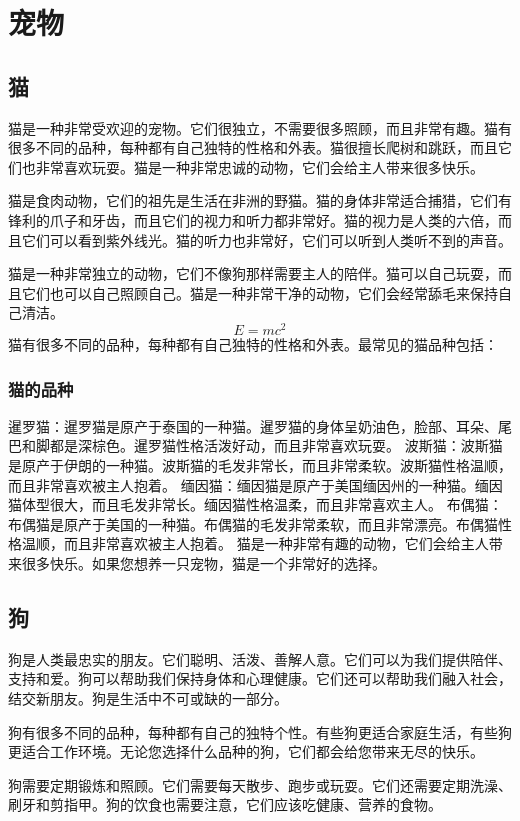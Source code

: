 \documentclass[engineeringmaster]{hquThesis}
\begin{document}
\chapter{宠物}
\section{猫}
猫是一种非常受欢迎的宠物。它们很独立，不需要很多照顾，而且非常有趣。猫有很多不同的品种，每种都有自己独特的性格和外表。猫很擅长爬树和跳跃，而且它们也非常喜欢玩耍。猫是一种非常忠诚的动物，它们会给主人带来很多快乐。

猫是食肉动物，它们的祖先是生活在非洲的野猫。猫的身体非常适合捕猎，它们有锋利的爪子和牙齿，而且它们的视力和听力都非常好。猫的视力是人类的六倍，而且它们可以看到紫外线光。猫的听力也非常好，它们可以听到人类听不到的声音。

猫是一种非常独立的动物，它们不像狗那样需要主人的陪伴。猫可以自己玩耍，而且它们也可以自己照顾自己。猫是一种非常干净的动物，它们会经常舔毛来保持自己清洁。
\begin{equation}
E = mc^2
\end{equation}
猫有很多不同的品种，每种都有自己独特的性格和外表。最常见的猫品种包括：
\subsection{猫的品种}
暹罗猫：暹罗猫是原产于泰国的一种猫。暹罗猫的身体呈奶油色，脸部、耳朵、尾巴和脚都是深棕色。暹罗猫性格活泼好动，而且非常喜欢玩耍。
波斯猫：波斯猫是原产于伊朗的一种猫。波斯猫的毛发非常长，而且非常柔软。波斯猫性格温顺，而且非常喜欢被主人抱着。
缅因猫：缅因猫是原产于美国缅因州的一种猫。缅因猫体型很大，而且毛发非常长。缅因猫性格温柔，而且非常喜欢主人。
布偶猫：布偶猫是原产于美国的一种猫。布偶猫的毛发非常柔软，而且非常漂亮。布偶猫性格温顺，而且非常喜欢被主人抱着。
猫是一种非常有趣的动物，它们会给主人带来很多快乐。如果您想养一只宠物，猫是一个非常好的选择。

\section{狗}
狗是人类最忠实的朋友。它们聪明、活泼、善解人意。它们可以为我们提供陪伴、支持和爱。狗可以帮助我们保持身体和心理健康。它们还可以帮助我们融入社会，结交新朋友。狗是生活中不可或缺的一部分。

狗有很多不同的品种，每种都有自己的独特个性。有些狗更适合家庭生活，有些狗更适合工作环境。无论您选择什么品种的狗，它们都会给您带来无尽的快乐。

狗需要定期锻炼和照顾。它们需要每天散步、跑步或玩耍。它们还需要定期洗澡、刷牙和剪指甲。狗的饮食也需要注意，它们应该吃健康、营养的食物。
\end{document}
